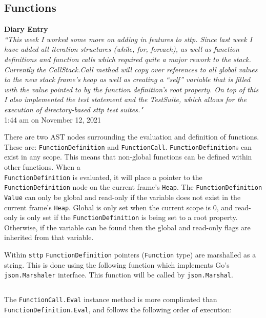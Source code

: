 \subsection{Functions}

\begin{center}
    \textbf{Diary Entry}\\[0.5em]
    \textit{``This week I worked some more on adding in features to sttp. Since last week I have added all iteration structures (while, for, foreach), as well as function definitions and function calls which required quite a major rework to the stack. Currently the CallStack.Call method will copy over references to all global values to the new stack frame’s heap as well as creating a “self” variable that is filled with the value pointed to by the function definition’s root property. On top of this I also implemented the test statement and the TestSuite, which allows for the execution of directory-based sttp test suites."}\\[0.5em]
    \tiny{1:44 am on November 12, 2021}
\end{center}

There are two AST nodes surrounding the evaluation and definition of functions. These are: \verb|FunctionDefinition| and \verb|FunctionCall|. \verb|FunctionDefinition|s can exist in any scope. This means that non-global functions can be defined within other functions. When a \\\verb|FunctionDefinition| is evaluated, it will place a pointer to the \verb|FunctionDefinition| node on the current frame's \verb|Heap|. The \verb|FunctionDefinition| \verb|Value| can only be global and read-only if the variable does not exist in the current frame's \verb|Heap|. Global is only set when the current scope is 0, and read-only is only set if the \verb|FunctionDefinition| is being set to a root property. Otherwise, if the variable can be found then the global and read-only flags are inherited from that variable.

Within \verb|sttp| \verb|FunctionDefinition| pointers (\verb|Function| type) are marshalled as a string. This is done using the following function which implements Go's \verb|json.Marshaler| interface. This function will be called by \verb|json.Marshal|.

\inputminted[firstline=374, lastline=379, autogobble, breaklines, tabsize=4]{go}{../../src/parser/functions.go}

The \verb|FunctionCall.Eval| instance method is more complicated than \verb|FunctionDefinition.Eval|, and follows the following order of execution:

